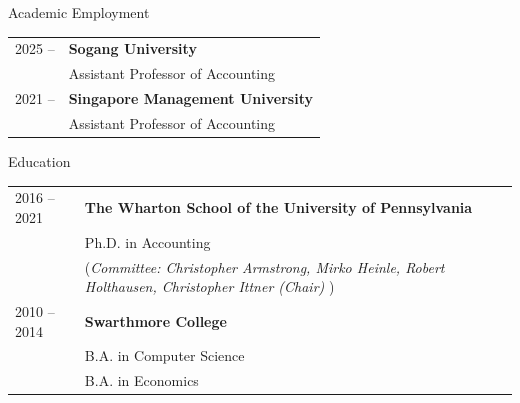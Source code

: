 \documentclass{resume} %
\begin{document}
\begin{rSection}{Academic Employment}

\begin{tabular}{p{2cm}p{16cm}}
2025 -- & \textbf{Sogang University} \smallskip \\
& \hspace{5mm} Assistant Professor of Accounting \\
2021 -- & \textbf{Singapore Management University} \smallskip \\
& \hspace{5mm} Assistant Professor of Accounting
\end{tabular}

\end{rSection}

\begin{rSection}{Education}

\begin{tabular}{p{2cm}p{16cm}}
2016 -- 2021 & \textbf{The Wharton School of the University of Pennsylvania} \smallskip \\
& \hspace{5mm} Ph.D. in Accounting \smallskip \\
& \hspace{5mm} (\emph{Committee: Christopher Armstrong, Mirko Heinle, Robert Holthausen, Christopher Ittner (Chair) }) \medskip \\
2010 -- 2014 & \textbf{Swarthmore College} \smallskip \\
& \hspace{5mm} B.A. in Computer Science \smallskip \\
& \hspace{5mm} B.A. in Economics
\end{tabular}

\end{rSection}
\end{document}
